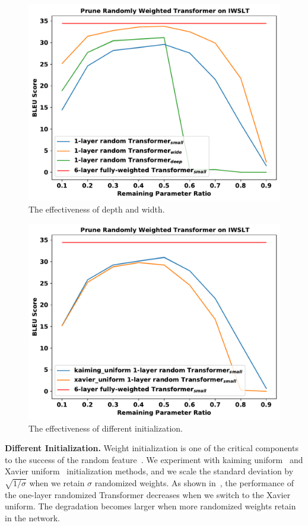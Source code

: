 \begin{figure}
    \centering
    \includegraphics[width=0.8\linewidth]{fig/iwslt_widedeep.pdf}
        \vspace{-5pt}
    \caption{The effectiveness of depth and width.}
    \label{fig:res_iwslt_widedeep}
    \vspace{-10pt}
\end{figure}


\begin{figure}
    \centering
    \includegraphics[width=0.8\linewidth]{fig/iwslt_init.pdf}
            \vspace{-5pt}
    \caption{The effectiveness of different initialization.}
    \label{fig:res_iwslt_init}
    \vspace{-10pt}
\end{figure}

\noindent\textbf{Different Initialization.}
Weight initialization is one of the critical components to the success of the random feature~\citep{Wieting:2019notraining,Ramanujan:2020hidden,shen2020reservoir}. 
We experiment with kaiming uniform~\citep{Ramanujan:2020hidden} and Xavier uniform~\citep{Vaswani:2017attention} initialization methods, and we scale the standard deviation by $\sqrt{1/\sigma}$ when we retain $\sigma$ randomized weights. 
As shown in~, the performance of the one-layer randomized Transformer decreases when we switch to the Xavier uniform. 
The degradation becomes larger when more randomized weights retain in the network. 





